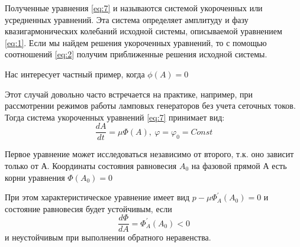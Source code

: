 Полученные уравнения  \eqref{eq:7} и называются системой укороченных или усредненных уравнений. Эта система определяет амплитуду и фазу квазигармонических колебаний исходной системы, описываемой уравнением  \eqref{eq:1}. Если мы найдем решения укороченных уравнений, то с помощью соотношений  \eqref{eq:2} получим приближенные решения исходной системы.

Нас интересует частный пример, когда $\phi(A)=0$

Этот случай довольно часто встречается на практике, например, при рассмотрении режимов работы ламповых генераторов без учета сеточных токов. Тогда система укороченных уравнений  \eqref{eq:7} принимает вид:
\begin{equation}
\label{eq:8}
\frac{dA}{dt}=\mu \Phi(A),~ \varphi=\varphi_0 = Const
\end{equation}

Первое уравнение может исследоваться независимо от второго, т.к. оно зависит только от А. Координаты состояния равновесия $A_{0}$ на фазовой прямой А есть корни уравнения $\Phi(A_{0})=0$

При этом характеристическое уравнение имеет вид $p-\mu \Phi^{'}_{A}(A_{0}) = 0$ и состояние равновесия будет устойчивым, если $$\frac{d\Phi}{dA}= \Phi^{'}_{A}(A_{0}) <0$$
и неустойчивым при выполнении обратного неравенства.


